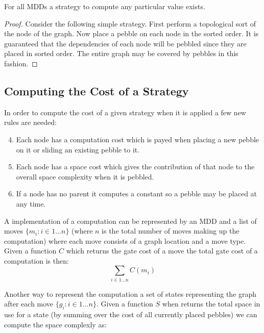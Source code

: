 \begin{theorem}
  For all MDDs a strategy to compute any particular value exists.
\end{theorem}

\begin{proof}

  Consider the following simple strategy.  First perform a topological sort of
  the node of the graph.  Now place a pebble on each node in the sorted order.
  It is guaranteed that the dependencies of each node will be pebbled since they
  are placed in sorted order. The entire graph may be covered by pebbles in this
  fashion.

\end{proof}



\subsection{Computing the Cost of a Strategy}

In order to compute the cost of a given strategy when it is applied a few
new rules are needed:

\begin{enumerate}
    \setcounter{enumi}{3}
  \item Each node has a computation cost which is payed when placing a new pebble on
    it or sliding an existing pebble to it.
  \item Each node has a space cost which gives the contribution of that node to
    the overall space complexity when it is pebbled.
  \item If a node has no parent it computes a constant so a pebble may be placed
    at any time.
\end{enumerate}

A implementation of a computation can be represented by an MDD and a list of
moves $\{m_i:i \in 1 \dotsc n\}$ (where $n$ is the total number of moves making up the
computation) where each move consists of a graph location and a move type. Given
a function $C$ which returns the gate cost of a move the total gate cost of a
computation is then:
\[ \sum_{i\in 1 \dotsc n} C(m_i) \]

Another way to represent the computation a set of states representing the graph
after each move $\{g_i:i \in 1 \dotsc n\}$. Given a function $S$ when returns
the total space in use for a state (by summing over the cost of all currently
placed pebbles) we can compute the space complexly as:

